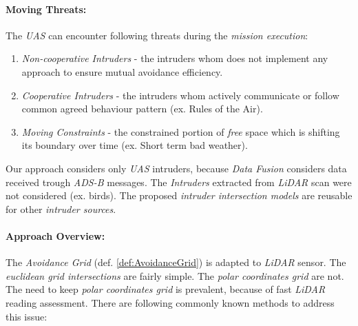 \paragraph{Moving Threats:} The \emph{UAS} can encounter following threats during the \emph{mission execution}:
\begin{enumerate}
    \item \emph{Non-cooperative Intruders} - the intruders whom does not implement any approach to ensure mutual avoidance efficiency.
    
    \item \emph{Cooperative Intruders} - the intruders whom actively communicate or follow common agreed behaviour pattern (ex. Rules of the Air).
    
    \item \emph{Moving Constraints} - the constrained portion of \emph{free} space which is shifting its boundary over time (ex. Short term bad weather).
\end{enumerate}
    
\begin{note}
    Our approach considers only \emph{UAS} intruders, because \emph{Data Fusion} considers data received trough \emph{ADS-B} messages. The \emph{Intruders} extracted from \emph{LiDAR} scan were not considered (ex. birds). The proposed \emph{intruder intersection models} are reusable for other \emph{intruder sources}.
\end{note}

\paragraph{Approach Overview:} The \emph{Avoidance Grid} (def. \ref{def:AvoidanceGrid}) is adapted to \emph{LiDAR} sensor. The \emph{euclidean grid intersections} are fairly simple. The \emph{polar coordinates grid} are not. The need to keep \emph{polar coordinates grid} is prevalent, because of fast \emph{LiDAR} reading assessment.  There are following commonly known methods to address this issue:

